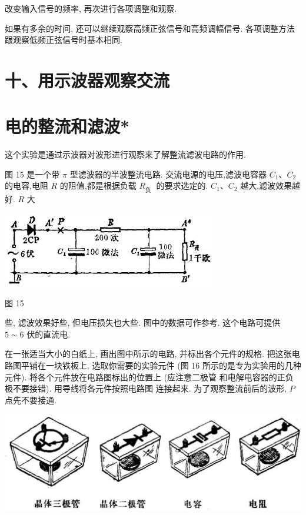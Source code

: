 \documentclass[10pt]{article}
\begin{document}
改变输入信号的频率, 再次进行各项调整和观察.

如果有多余的时间, 还可以继续观察高频正弦信号和高频调幅信号. 各项调整方法跟观察低频正弦信号时基本相同.

\section*{十、用示波器观察交流}

\section*{电的整流和滤波*}

这个实验是通过示波器对波形进行观察来了解整流滤波电路的作用.

图 15 是一个带 \(\pi\) 型滤波器的半波整流电路. 交流电源的电压,滤波电容器 \({C}_{1}\text{、}{C}_{2}\) 的电容,电阻 \(R\) 的阻值,都是根据负载 \({R}_{\text{负 }}\) 的要求选定的. \({C}_{1}\text{、}{C}_{2}\) 越大,滤波效果越好. \(R\) 大

\begin{center}
\includegraphics[max width=0.7\textwidth]{images/01913056-1f15-74d8-9184-9aab52c9d66b_389_352253.jpg}
\end{center}

图 15

些, 滤波效果好些, 但电压损失也大些. 图中的数据可作参考. 这个电路可提供 \(5 \sim 6\) 伏的直流电.

在一张适当大小的白纸上, 画出图中所示的电路, 并标出各个元件的规格. 把这张电路图平铺在一块铁板上. 选取你需要的实验元件 (图 16 所示的是专为实验用的几种元件). 将各个元件放在电路图标出的位置上 (应注意二极管 和电解电容器的正负极不要接错). 用导线将各元件按照电路图 连接起来. 为了观察整流前后的波形, \(P\) 点先不要接通.

\begin{center}
\includegraphics[max width=1.0\textwidth]{images/01913056-1f15-74d8-9184-9aab52c9d66b_389_497440.jpg}
\end{center}
\end{document}
